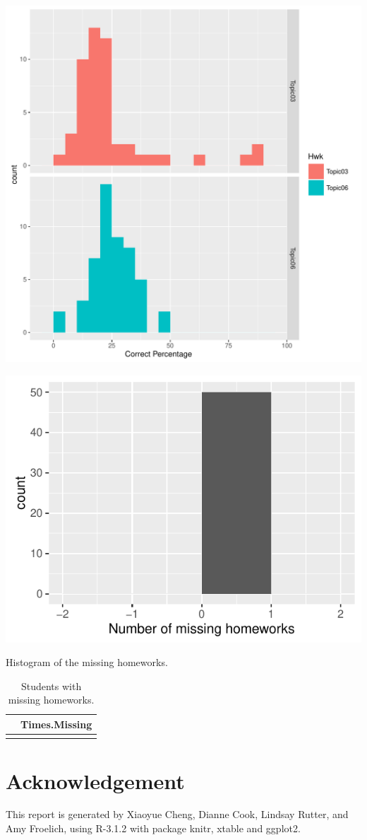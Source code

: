 \documentclass[12pt,nohyper]{tufte-handout}\usepackage[]{graphicx}\usepackage[]{color}
\makeatletter
\def\maxwidth{ %
  \ifdim\Gin@nat@width>\linewidth
    \linewidth
  \else
    \Gin@nat@width
  \fi
}
\makeatother
\begin{document}
\includegraphics[width=\maxwidth]{figure/unnamed-chunk-6-1} 
\begin{marginfigure}\includegraphics[width=0.95\linewidth]{Stat101_SectionAB_missinghwk}
\caption{\label{mar:missing}Histogram of the missing homeworks.}\end{marginfigure}%
\begin{longtable}{rr}
  \hline
 & Times.Missing \\ 
  \hline
\hline
\hline
\caption{Students with missing homeworks.} 
\label{tab:missing}
\end{longtable}


\clearpage
\newpage{}
\section{Acknowledgement}
This report is generated by Xiaoyue Cheng, Dianne Cook, Lindsay Rutter, and Amy Froelich, using R-3.1.2 with package knitr, xtable and ggplot2.
\end{document}
